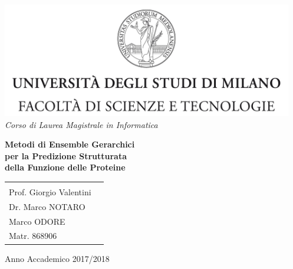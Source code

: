 \documentclass[12pt]{report}
\begin{document}
\begin{titlepage}
  \begin{center}
    \includegraphics[height=5.0cm]{./images/minerva_2.jpg}
    \vspace*{.4cm}
    {\Large 
      \emph{\\Corso di Laurea Magistrale in Informatica}
    }
    \vfill
    \begin{LARGE}
      \textbf{Metodi di Ensemble Gerarchici \\[.2cm] per la Predizione Strutturata \\[.3cm]della Funzione delle Proteine}
    \end{LARGE}
    
    \vfill
    \begin{minipage}{.99\linewidth}
      \begin{tabular}{l r}
        \begin{minipage}{.4\linewidth}
          \begin{flushleft}
            {\large
              RELATORE\\[.3cm]
              Prof. Giorgio Valentini
            }

            {\large
              CORRELATORE\\[.3cm]
               Dr. Marco NOTARO
            }
          \end{flushleft}
        \end{minipage}
        &
        \begin{minipage}{.6\linewidth}
          \begin{flushright}
            {\large
              TESI DI LAUREA DI\\[.3cm]
              Marco ODORE\\[.45cm]
              Matr. 868906
            }
          \end{flushright}
        \end{minipage}
      \end{tabular}
    \end{minipage}
    
    \vfill
    {\large{{Anno Accademico 2017/2018}}}
  \end{center}
\end{titlepage}
\end{document}
